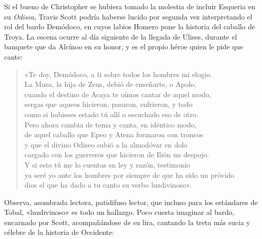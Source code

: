Si el bueno de Christopher se hubiera tomado la molestia de incluir Esqueria en su \emph{Odisea}, Travis Scott podría haberse lucido por segunda vez interpretando el rol del bardo Demódoco, en cuyos labios Homero pone la historia del caballo de Troya. La escena ocurre al día siguiente de la llegada de Ulises, durante el banquete que da Alcínoo en su honor, y es el propio héroe quien le pide que cante:

\begin{verse}
«Te doy, Demódoco, a ti sobre todos los hombres mi elogio.\\
La Musa, la hija de Zeus, debió de enseñarte, o Apolo,\\
cuando el destino de Acaya te oímos cantar de aquel modo,\\
sergas que aqueos hicieron, pasaron, sufrieron, y todo\\
como si hubieses estado tú allí o escuchado eso de otro.\\
Pero ahora cambia de tema y canta, en idéntico modo,\\
de aquel caballo que Epeo y Atena formaron con troncos\\
y que el divino Odiseo subió a la almodóvar en dolo\\
cargado con los guerreros que hicieron de Ilión un despojo.\\
Y si esto tú me lo cuentas en ley y razón, testimonio\\
ya seré yo ante los hombres por siempre de que ha sido un próvido\\
dios el que ha dado a tu canto su verbo luzdivinoso».
\end{verse}

Observa, asombrada lectora, patidifuso lector, que incluso para los estándares de Tobal, «luzdivinoso» es todo un hallazgo. Poco cuesta imaginar al bardo, encarnado por Scott, acompañándose de su lira, cantando la treta más sucia y célebre de la historia de Occidente:

